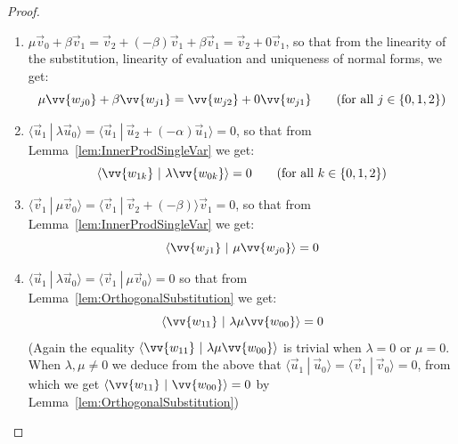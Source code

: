 \documentclass[a4paper,UKenglish,numberwithinsect,pdfa,anonymous]{lipics-v2021}
\theoremstyle{restatestyle}
\def\scal#1#2{\langle{#1}~|~{#2}\rangle}
\begin{document}
\begin{lemma}
\begin{proof}
\begin{enumerate}
        \item\label{A9:it2} $\mu\vec{v}_{0} + \beta\vec{v}_{1}=\vec{v}_{2} + (-\beta) \vec{v}_{1} + \beta \vec{v}_{1} = \vec{v}_{2} + 0 \vec{v}_{1}$, so that from the linearity of the substitution, linearity of evaluation and uniqueness of normal forms, we get:
        \[
        \mu\vv{w_{j0}} + \beta \vv{w_{j1}} = \vv{w_{j2}} + 0 \vv{w_{j1}} \qquad(\text{for all }j\in\{0,1,2\})
        \]
        
        \item\label{A9:it3} $\scal{\vec{u}_{1}}{\lambda\vec{u}_{0}}=\scal{\vec{u}_{1}}{\vec{u}_{2}+(- \alpha)\vec{u}_{1}}=0$, so that from Lemma~\ref{lem:InnerProdSingleVar} we get:
        \[
        \scal{\vv{w_{1k}}}{\lambda\vv{w_{0k}}}= 0 \qquad(\text{for all }k\in\{0,1,2\})
        \]
        
        \item\label{A9:it4} $\scal{\vec{v}_{1}}{\mu\vec{v}_{0}}=\scal{\vec{v}_{1}}{\vec{v}_{2} + (-\beta)}\vec{v}_{1}=0$, so that from Lemma~\ref{lem:InnerProdSingleVar} we get:
        \[
        \scal{\vv{w_{j1}}}{\mu\vv{w_{j0}}}=0
        \]
                
        \item\label{A9:it5} $\scal{\vec{u}_{1}}{\lambda\vec{u}_{0}}=\scal{\vec{v}_{1}}{\mu\vec{v}_{0}}=0$ so that from Lemma~\ref{lem:OrthogonalSubstitution} we get:
        \[
        \scal{\vv{w_{11}}}{\lambda\mu\vv{w_{00}}}=0
        \]
        (Again the equality $\scal{\vv{w_{11}}}{\lambda\mu\vv{w_{00}}}$ is trivial when $\lambda=0$ or $\mu=0$. When $\lambda ,\mu\neq 0$ we deduce from the above that $\scal{\vec{u}_{1}}{\vec{u}_{0}}=\scal{\vec{v}_{1}}{\vec{v}_{0}}=0$, from which we get $\scal{\vv{w_{11}}}{\vv{w_{00}}}=0$ by Lemma~\ref{lem:OrthogonalSubstitution})
    \end{enumerate}


\end{proof}
\end{lemma}
\end{document}
